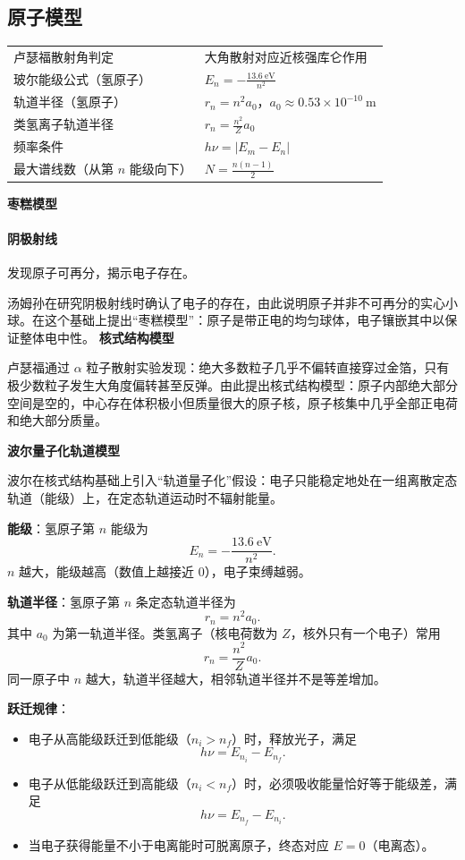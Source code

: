 
\subsection{原子模型}
\begin{tabularx}{\columnwidth}{XX}
  卢瑟福散射角判定&大角散射对应近核强库仑作用\\
  玻尔能级公式（氢原子）&$E_n=-\frac{13.6\ \mathrm{eV}}{n^2}$\\
  轨道半径（氢原子）&$r_n=n^2a_0$，$a_0\approx 0.53\times 10^{-10}\ \mathrm{m}$\\
  类氢离子轨道半径&$r_n=\frac{n^2}{Z}a_0$\\
  频率条件&$h\nu=|E_m-E_n|$\\
  最大谱线数（从第 $n$ 能级向下）&$N=\frac{n(n-1)}{2}$\\
\end{tabularx}
\textbf{枣糕模型}
\paragraph{阴极射线} 发现原子可再分，揭示电子存在。

汤姆孙在研究阴极射线时确认了电子的存在，由此说明原子并非不可再分的实心小球。在这个基础上提出“枣糕模型”：原子是带正电的均匀球体，电子镶嵌其中以保证整体电中性。
\textbf{核式结构模型}

卢瑟福通过 $\alpha$ 粒子散射实验发现：绝大多数粒子几乎不偏转直接穿过金箔，只有极少数粒子发生大角度偏转甚至反弹。由此提出核式结构模型：原子内部绝大部分空间是空的，中心存在体积极小但质量很大的原子核，原子核集中几乎全部正电荷和绝大部分质量。

\textbf{波尔量子化轨道模型}

波尔在核式结构基础上引入“轨道量子化”假设：电子只能稳定地处在一组离散定态轨道（能级）上，在定态轨道运动时不辐射能量。

\textbf{能级}：氢原子第 $n$ 能级为
\[
  E_n=-\frac{13.6\ \mathrm{eV}}{n^2}.
\]
$n$ 越大，能级越高（数值上越接近 0），电子束缚越弱。

\textbf{轨道半径}：氢原子第 $n$ 条定态轨道半径为
\[
  r_n=n^2a_0.
\]
其中 $a_0$ 为第一轨道半径。类氢离子（核电荷数为 $Z$，核外只有一个电子）常用
\[
  r_n=\frac{n^2}{Z}a_0.
\]
同一原子中 $n$ 越大，轨道半径越大，相邻轨道半径并不是等差增加。

\textbf{跃迁规律}：
\begin{itemize}
  \item 电子从高能级跃迁到低能级（$n_i>n_f$）时，释放光子，满足
        \[
          h\nu=E_{n_i}-E_{n_f}.
        \]
  \item 电子从低能级跃迁到高能级（$n_i<n_f$）时，必须吸收能量恰好等于能级差，满足
        \[
          h\nu=E_{n_f}-E_{n_i}.
        \]
  \item 当电子获得能量不小于电离能时可脱离原子，终态对应 $E=0$（电离态）。
\end{itemize}

